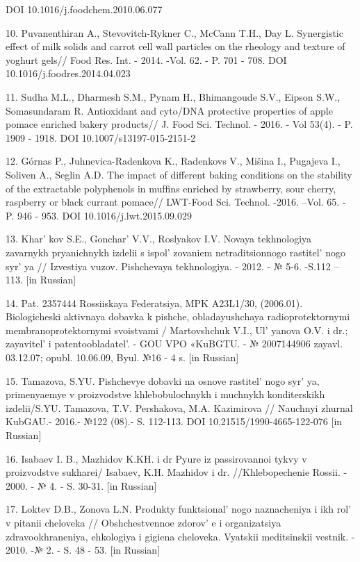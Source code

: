 DOI 10.1016/j.foodchem.2010.06.077

10. Puvanenthiran A., Stevovitch-Rykner C., McCann T.H., Day L.
Synergistic effect of milk solids and carrot cell wall particles on the
rheology and texture of yoghurt gels// Food Res. Int. - 2014. -Vol. 62.
- P. 701 - 708. DOI 10.1016/j.foodres.2014.04.023

11. Sudha M.L., Dharmesh S.M., Pynam H., Bhimangoude S.V., Eipson S.W.,
Somasundaram R. Antioxidant and cyto/DNA protective properties of apple
pomace enriched bakery products// J. Food Sci. Technol. - 2016. - Vol
53(4). - P. 1909 - 1918. DOI 10.1007/s13197-015-2151-2

12. Górnas P., Juhnevica-Radenkova K., Radenkovs V., Mišina I., Pugajeva
I., Soliven A., Seglin A.D. The impact of different baking conditions on
the stability of the extractable polyphenols in mufﬁns enriched by
strawberry, sour cherry, raspberry or black currant pomace// LWT-Food
Sci. Technol. -2016. --Vol. 65. - P. 946 - 953. DOI
10.1016/j.lwt.2015.09.029

13. Khar' kov S.E., Gonchar'{} V.V.,
Roslyakov I.V. Novaya tekhnologiya zavarnykh pryanichnykh izdelii s
ispol' zovaniem netraditsionnogo
rastitel' nogo syr' ya // Izvestiya vuzov.
Pishchevaya tekhnologiya. - 2012. - № 5-6. -S.112 -- 113. {[}in
Russian{]}

14. Pat. 2357444 Rossiiskaya Federatsiya, MPK A23L1/30, (2006.01).
Biologicheski aktivnaya dobavka k pishche, obladayushchaya
radioprotektornymi membranoprotektornymi svoistvami / Martovshchuk V.I.,
Ul' yanova O.V. i dr.; zayavitel'{} i
patentoobladatel'. - GOU VPO «KuBGTU. - № 2007144906
zayavl. 03.12.07; opubl. 10.06.09, Byul. №16 - 4 s. {[}in Russian{]}

15. Tamazova, S.YU. Pishchevye dobavki na osnove
rastitel' nogo syr' ya, primenyaemye v
proizvodstve khlebobulochnykh i muchnykh konditerskikh izdelii/S.YU.
Tamazova, T.V. Pershakova, M.A. Kazimirova // Nauchnyi zhurnal KubGAU.-
2016.- №122 (08).- S. 112-113. DOI 10.21515/1990-4665-122-076 {[}in
Russian{]}

16. Isabaev I. B., Mazhidov K.KH. i dr Pyure iz passirovannoi tykvy v
proizvodstve sukharei/ Isabaev, K.H. Mazhidov i dr. //Khlebopechenie
Rossii. - 2000. - № 4. - S. 30-31. {[}in Russian{]}

17. Loktev D.B., Zonova L.N. Produkty funktsional' nogo
naznacheniya i ikh rol'{} v pitanii cheloveka //
Obshchestvennoe zdorov' e i organizatsiya
zdravookhraneniya, ehkologiya i gigiena cheloveka. Vyatskii meditsinskii
vestnik. - 2010. -№ 2. - S. 48 - 53. {[}in Russian{]}

